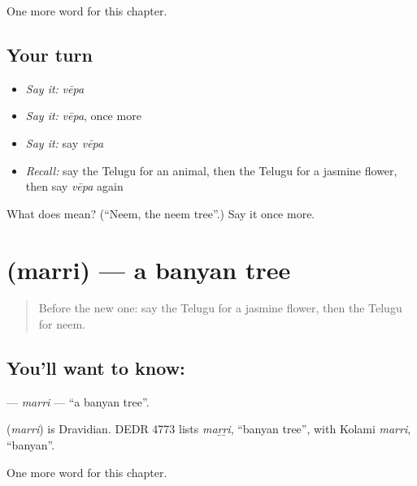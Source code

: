 \begin{grammarlens}[title={What you've built}]
One more word for this chapter.
\end{grammarlens}

\subsection*{Your turn}
\begin{itemize}
\raggedright
  \item \emph{Say it:} \emph{vēpa}
  \item \emph{Say it:} \emph{vēpa}, once more
  \item \emph{Say it:} say \emph{vēpa}
  \item \emph{Recall:} say the Telugu for an animal, then the Telugu for a jasmine flower, then say \emph{vēpa} again
\end{itemize}

\begin{tcolorbox}[breakable,colback=teal!4,colframe=teal!35!black,title={Before you move on}]
What does  mean? (\textquotedblleft{}Neem, the neem tree\textquotedblright{}.) Say it once more.
\end{tcolorbox}
\section[\texorpdfstring{\te{మర్రి} (marri)}{మర్రి (marri)}]{ (marri) — a banyan tree}

\label{lesson:TE-C266-marri}



\begin{quote}
Before the new one: say the Telugu for a jasmine flower, then the Telugu for neem.
\end{quote}

\subsection*{You'll want to know: }
\textbf{} — \emph{marri} — \textquotedblleft{}a banyan tree\textquotedblright{}.

\begin{cousinweb}
\textbf{} (\emph{marri}) is Dravidian. DEDR 4773 lists \emph{maṟṟi}, \textquotedblleft{}banyan tree\textquotedblright{}, with Kolami \emph{marri}, \textquotedblleft{}banyan\textquotedblright{}.
\end{cousinweb}

\begin{grammarlens}[title={What you've built}]
One more word for this chapter.
\end{grammarlens}

